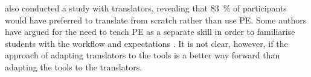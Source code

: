 \textcite{carl2015post} also conducted a study with translators, revealing that 83~\% of participants would have preferred to translate from scratch rather than use \ac{PE}. Some authors have argued for the need to teach \ac{PE} as a separate skill in order to familiarise students with the workflow and expectations \parencite{obrien2002teach}. It is not clear, however, if the approach of adapting translators to the tools is a better way forward than adapting the tools to the translators.


